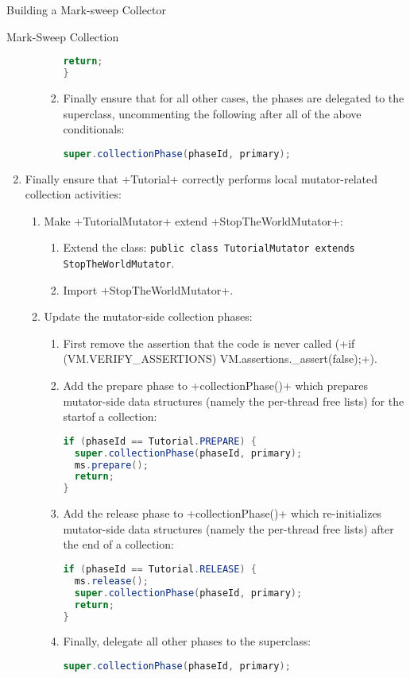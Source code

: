 \begin{section}{Building a Mark-sweep Collector}
\begin{subsection}{Mark-Sweep Collection}
\begin{enumerate}
\begin{enumerate}
\begin{enumerate}
\begin{lstlisting}[language=Java]
  return;
}
             \end{lstlisting}
           \item Finally ensure that for all other cases, the phases are delegated to the superclass, uncommenting the following after all of the above conditionals:
             \begin{lstlisting}[language=Java]
super.collectionPhase(phaseId, primary);
             \end{lstlisting}
         \end{enumerate}
    \end{enumerate} 
  \item Finally ensure that \spverb+Tutorial+ correctly performs local mutator-related collection activities:
    \begin{enumerate}
      \item Make \spverb+TutorialMutator+ extend \spverb+StopTheWorldMutator+:
        \begin{enumerate}
          \item Extend the class: \texttt{pu\-blic class Tu\-to\-rial\-Mu\-ta\-tor ex\-tends Stop\-The\-World\-Mu\-ta\-tor}.
          \item Import \spverb+StopTheWorldMutator+.
        \end{enumerate}
      \item Update the mutator-side collection phases:
        \begin{enumerate}
          \item First remove the assertion that the code is never called (\spverb+if (VM.VERIFY_ASSERTIONS) VM.assertions._assert(false);+).
          \item Add the prepare phase to \spverb+collectionPhase()+ which prepares mutator-side data structures (namely the per-thread free lists) for the startof a collection:
            \begin{lstlisting}[language=Java]
if (phaseId == Tutorial.PREPARE) {
  super.collectionPhase(phaseId, primary);
  ms.prepare();
  return;
}
            \end{lstlisting}
          \item Add the release phase to \spverb+collectionPhase()+ which re-initializes mutator-side data structures (namely the per-thread free lists) after the end of a collection:
            \begin{lstlisting}[language=Java]
if (phaseId == Tutorial.RELEASE) {
  ms.release();
  super.collectionPhase(phaseId, primary);
  return;
}
            \end{lstlisting}
          \item Finally, delegate all other phases to the superclass:
            \begin{lstlisting}[language=Java]
super.collectionPhase(phaseId, primary);
            \end{lstlisting}
        \end{enumerate}
    \end{enumerate}
\end{enumerate}


\end{subsection}
\end{section}
